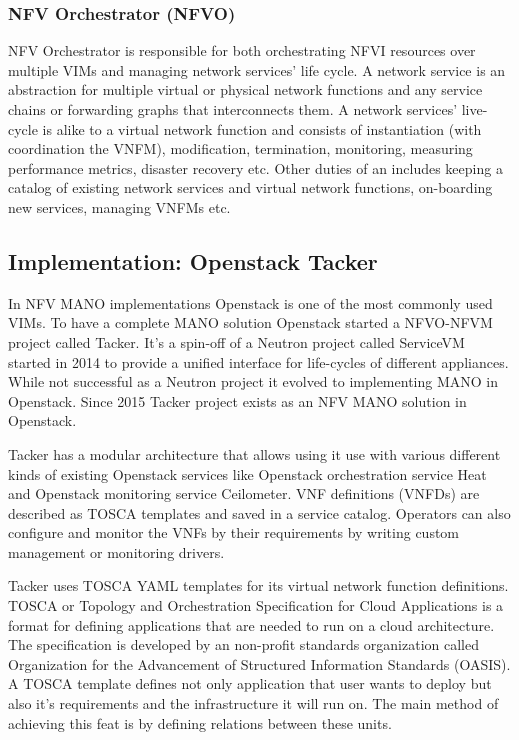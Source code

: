\documentclass[12pt,oneandhalf,chaparabic,ceng,ms,eng,oneside,pntc]{gsufbe}
\begin{document}
\subsubsection{NFV Orchestrator (NFVO)}
NFV Orchestrator is responsible for both orchestrating NFVI resources over multiple VIMs and managing
network services' life cycle. A network service is an abstraction for multiple virtual or physical
network functions and any service chains or forwarding graphs that interconnects them. A network
services' live-cycle is alike to a virtual network function and consists of instantiation (with
coordination the VNFM), modification, termination, monitoring, measuring performance metrics, disaster
recovery etc. Other duties of an includes keeping a catalog of existing network services and virtual
network functions, on-boarding new services, managing VNFMs etc.

\subsection{Implementation: Openstack Tacker}
In NFV MANO implementations Openstack is one of the most commonly used VIMs. To have a complete MANO
solution Openstack started a NFVO-NFVM project called Tacker. It's a spin-off of a Neutron project
called ServiceVM started in 2014 to provide a unified interface for life-cycles of different
appliances. While not successful as a Neutron project it evolved to implementing MANO in Openstack.
Since 2015 Tacker project exists as an NFV MANO solution in Openstack.

Tacker has a modular architecture that allows using it use with various different kinds of
existing Openstack services like Openstack orchestration service Heat and Openstack monitoring service
Ceilometer. VNF definitions (VNFDs) are described as TOSCA templates and saved in a service catalog.
Operators can also configure and monitor the VNFs by their requirements by writing custom management or
monitoring drivers.

Tacker uses TOSCA YAML templates for its virtual network function definitions. TOSCA or Topology and
Orchestration Specification for Cloud Applications is a format for defining applications that are needed
to run on a cloud architecture. The specification is developed by an non-profit standards organization
called Organization for the Advancement of Structured Information Standards (OASIS).
A TOSCA template defines not only application that user wants to deploy but also
it's requirements and the infrastructure it will run on. The main method of achieving
this feat is by defining relations between these units.
\end{document}
